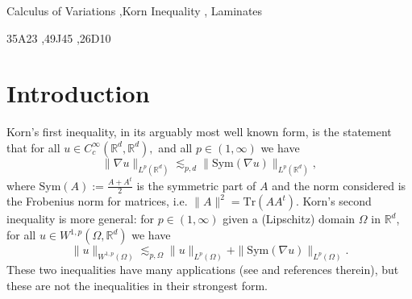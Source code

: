 \documentclass[11pt, a4paper, reqno]{elsarticle}
\theoremstyle{definition}
\theoremstyle{remark}
\begin{document}
\begin{frontmatter}
\begin{abstract}
Nous reformulons le problème de Chipot dans le langage de la convexité de rang un et de la quasiconvexité, et obtenons une caractérisation purement algébrique des cas où de telles inégalités sont valables, ce qui donne les bornes optimales
\begin{align*}
N(d,\Omega)&=2d(1-o(1))\\
N'(d,\Omega)&=2d-1.
\end{align*}
En conséquence, nous retrouvons et simplifions plusieurs résultats de Chipot, obtenons une inégalité de Korn optimale en dimension ainsi que plusieurs estimations optimales de la meilleure constante pour diverses inégalités de type Korn. Des généralisations au cas rectangulaire et à des estimations générales dans $L^p$ sont également considérées.

L’ingrédient central nouveau de notre approche est un lien systématique entre laminés et martingales, qui produit des familles explicites de laminés réalisant ces bornes. Cette méthode présente un intérêt indépendant dans le calcul des variations : par exemple, nous l’utilisons pour obtenir une nouvelle preuve rapide et quantitative de la non-inégalité d’Ornstein, valable pour tous les opérateurs homogènes du premier ordre dans $\mathbb{R}^{2\times 2}$ et pour une large classe d’opérateurs en dimensions générales, incluant les opérateurs de Korn $\frac{\nabla u+\nabla u^t}2$ et $\frac{\nabla u+\nabla u^t}2-\mathrm{div}(u)\frac{\mathrm{Id}}d$.
\end{abstract}
\begin{keyword}
Calculus of Variations \sep Korn Inequality \sep
Laminates

\MSC[2020] 35A23 \sep 49J45 \sep 26D10
\end{keyword}
\end{frontmatter}

\section{Introduction}
Korn's first inequality, in its arguably most well known 
form, is the statement that for all
$u\in C^\infty_c(\mathbb{R}^d, \mathbb{R}^d),$ and all $p\in(1,\infty)$ we have 
\begin{equation*}
    \|\nabla u\|_{L^p(\mathbb{R}^d)}
\lesssim_{p,d}
    \|\mathrm{Sym}(\nabla u)\|_{L^p(\mathbb{R}^d)},
\end{equation*}
where $\mathrm{Sym}(A):=\frac{A+A^t}2$ is the symmetric 
part of $A$ and the norm considered
is the Frobenius norm for matrices, i.e. 
$\|A\|^2=\mathrm{Tr}(AA^t)$.
Korn's second inequality is more general: for $p\in (1,\infty)$ given a 
(Lipschitz) domain $\Omega$ in $\mathbb{R}^d$, for all 
$u\in W^{1,p}(\Omega, \mathbb{R}^d)$ we have
\begin{equation*}
    \|u\|_{W^{1,p}(\Omega)}
\lesssim_{p,\Omega} 
    \|u\|_{L^p(\Omega)}
+
    \|\mathrm{Sym}(\nabla u)\|_{L^p(\Omega)}.
\end{equation*}
These two inequalities have many applications
(see \cite{PoinKorn} and references therein), but these are 
not the inequalities in their strongest form.
\end{document}
